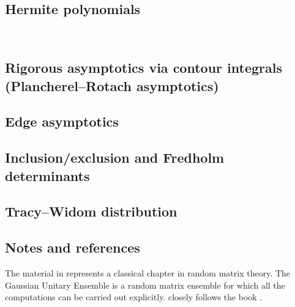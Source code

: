 \documentclass[letterpaper,11pt,oneside,reqno]{amsart}
\numberwithin{equation}{section}
\newcommand{\lect}[1]{}
\theoremstyle{definition}
\begin{document}
\subsection{Hermite polynomials} %
\label{sub:hermite_polynomials}


{\ }\\\lect{3/16/2016}

\subsection{Rigorous asymptotics via contour integrals (Plancherel--Rotach asymptotics)} %
\label{sub:rigorous_asymptotics_via_contour_integrals}

\cite{Plancherel_Rotach_original}


\subsection{Edge asymptotics} %
\label{sub:edge_asymptotics}


\subsection{Inclusion/exclusion and Fredholm determinants} %
\label{sub:inclusion_exclusion_and_fredholm_determinants}


\subsection{Tracy--Widom distribution} %
\label{sub:tracy_widom_distribution}

\cite{TW_Airy_Painleve_2002}



\subsection{Notes and references} %
\label{sub:notes_GUE}

The material in  represents a classical 
chapter in random matrix theory. 
The Gaussian Unitary Ensemble is a random matrix ensemble for which all the computations
can be carried out explicitly. 
closely follows the book \cite{TaoRMbook}.
\end{document}
